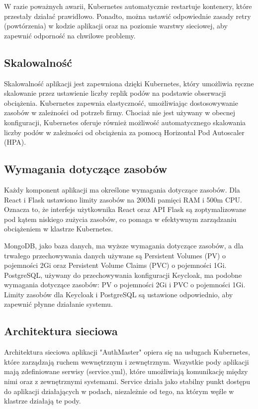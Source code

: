 \documentclass[12pt,a4paper]{article}
\begin{document}
W razie poważnych awarii, Kubernetes automatycznie restartuje kontenery, które przestały działać prawidłowo. Ponadto, można ustawić odpowiednie zasady retry (powtórzenia) w kodzie aplikacji oraz na poziomie warstwy sieciowej, aby zapewnić odporność na chwilowe problemy.

\subsection{Skalowalność}
\label{sec:ExamplesSection}

Skalowalność aplikacji jest zapewniona dzięki Kubernetes, który umożliwia ręczne skalowanie przez ustawienie liczby replik podów na podstawie obserwacji obciążenia. Kubernetes zapewnia elastyczność, umożliwiając dostosowywanie zasobów w zależności od potrzeb firmy. Chociaż nie jest używany w obecnej konfiguracji, Kubernetes oferuje również możliwość automatycznego skalowania liczby podów w zależności od obciążenia za pomocą Horizontal Pod Autoscaler (HPA).

\subsection{Wymagania dotyczące zasobów}
\label{sec:ExampleTables}

Każdy komponent aplikacji ma określone wymagania dotyczące zasobów. Dla React i Flask ustawiono limity zasobów na 200Mi pamięci RAM i 500m CPU. Oznacza to, że interfejs użytkownika React oraz API Flask są zoptymalizowane pod kątem niskiego zużycia zasobów, co pomaga w efektywnym zarządzaniu obciążeniem w klastrze Kubernetes.

MongoDB, jako baza danych, ma wyższe wymagania dotyczące zasobów, a dla trwałego przechowywania danych używane są Persistent Volumes (PV) o pojemności 2Gi oraz Persistent Volume Claims (PVC) o pojemności 1Gi. PostgreSQL, używany do przechowywania konfiguracji Keycloak, ma podobne wymagania dotyczące zasobów: PV o pojemności 2Gi i PVC o pojemności 1Gi. Limity zasobów dla Keycloak i PostgreSQL są ustawione odpowiednio, aby zapewnić płynne działanie systemu.


\subsection{Architektura sieciowa}
\label{sec:ExampleResults}

Architektura sieciowa aplikacji "AuthMaster" opiera się na usługach Kubernetes, które zarządzają ruchem wewnętrznym i zewnętrznym. Wszystkie pody aplikacji mają zdefiniowane serwisy (service.yml), które umożliwiają komunikację między nimi oraz z zewnętrznymi systemami. Service działa jako stabilny punkt dostępu do aplikacji działających w podach, niezależnie od tego, na którym węźle w klastrze działają te pody.
\end{document}
